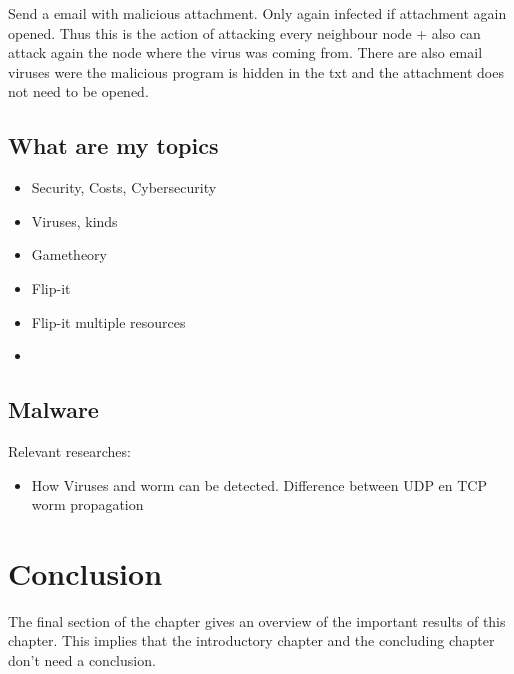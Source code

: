 Send a email with malicious attachment. Only again infected if attachment again opened. Thus this is the action of attacking every neighbour node + also can attack again the node where the virus was coming from.
There are also email viruses were the malicious program is hidden in the txt and the attachment does not need to be opened. 



\subsection{What are my topics}
\begin{itemize}
\item Security, Costs, Cybersecurity
\item Viruses, kinds
\item Gametheory
\item Flip-it
\item Flip-it multiple resources
\item 
\end{itemize}

\subsection{Malware}
Relevant researches:
\begin{itemize}
\item How Viruses and worm can be detected. Difference between UDP en TCP worm propagation
\end{itemize}






\section{Conclusion}
The final section of the chapter gives an overview of the important results
of this chapter. This implies that the introductory chapter and the
concluding chapter don't need a conclusion.



%
